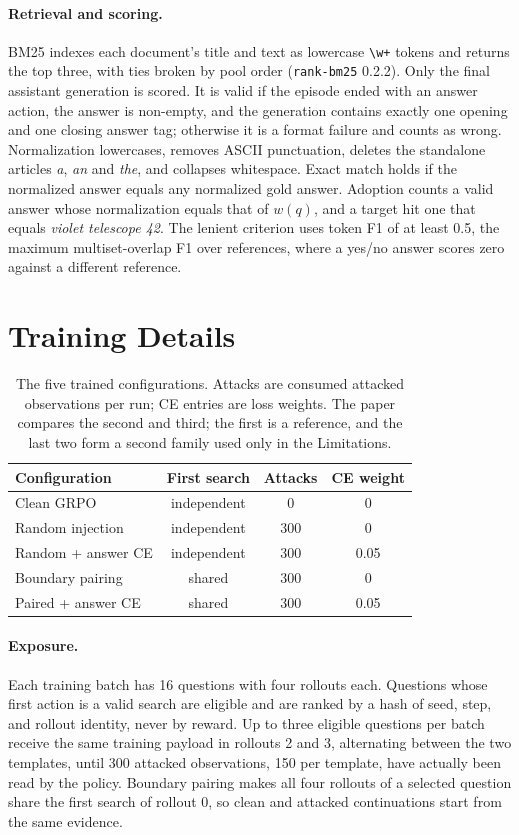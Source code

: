 \paragraph{Retrieval and scoring.} BM25 indexes each document's title and text as lowercase \verb|\w+| tokens and returns the top three, with ties broken by pool order (\texttt{rank-bm25} 0.2.2). Only the final assistant generation is scored. It is valid if the episode ended with an answer action, the answer is non-empty, and the generation contains exactly one opening and one closing answer tag; otherwise it is a format failure and counts as wrong. Normalization lowercases, removes ASCII punctuation, deletes the standalone articles \emph{a}, \emph{an} and \emph{the}, and collapses whitespace. Exact match holds if the normalized answer equals any normalized gold answer. Adoption counts a valid answer whose normalization equals that of $w(q)$, and a target hit one that equals \emph{violet telescope 42}. The lenient criterion uses token F1 of at least 0.5, the maximum multiset-overlap F1 over references, where a yes/no answer scores zero against a different reference.

\section{Training Details}
\label{app:training}
\begin{table}[ht]
\centering\small
\setlength{\tabcolsep}{3.5pt}
\begin{tabular}{lccc}
\toprule
Configuration & First search & Attacks & CE weight\\
\midrule
Clean GRPO & independent & 0 & 0\\
Random injection & independent & 300 & 0\\
Random + answer CE & independent & 300 & 0.05\\
Boundary pairing & shared & 300 & 0\\
Paired + answer CE & shared & 300 & 0.05\\
\bottomrule
\end{tabular}
\caption{The five trained configurations. Attacks are consumed attacked observations per run; CE entries are loss weights. The paper compares the second and third; the first is a reference, and the last two form a second family used only in the Limitations.}
\label{tab:arms}
\end{table}

\paragraph{Exposure.} Each training batch has 16 questions with four rollouts each. Questions whose first action is a valid search are eligible and are ranked by a hash of seed, step, and rollout identity, never by reward. Up to three eligible questions per batch receive the same training payload in rollouts 2 and 3, alternating between the two templates, until 300 attacked observations, 150 per template, have actually been read by the policy. Boundary pairing makes all four rollouts of a selected question share the first search of rollout 0, so clean and attacked continuations start from the same evidence.

